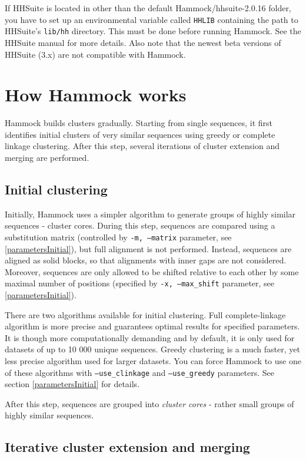 \documentclass[11pt, a4paper, twoside, titlepage]{article}
\begin{document}
If HHSuite is located in other than the default Hammock/hhsuite-2.0.16 folder, you have to set up an environmental variable called \texttt{HHLIB} containing the path to HHSuite's \texttt{lib/hh} directory. This must be done before running Hammock. See the HHSuite manual for more details. Also note that the newest beta versions of HHSuite (3.x) are not compatible with Hammock. 


\section{How Hammock works}
\label{howhammockworks}
Hammock builds clusters gradually. Starting from single sequences, it first identifies initial clusters of very similar sequences using greedy or complete linkage clustering. After this step, several iterations of cluster extension and merging are performed.

\subsection{Initial clustering}
Initially, Hammock uses a simpler algorithm to generate groups of highly similar sequences - cluster cores. During this step, sequences are compared using a substitution matrix (controlled by \texttt{-m, --matrix} parameter, see \ref{parametersInitial}), but full alignment is not performed. Instead, sequences are aligned as solid blocks, so that alignments with inner gaps are not considered. Moreover, sequences are only allowed to be shifted relative to each other by some maximal number of positions (specified by \texttt{-x, --max\_shift} parameter, see \ref{parametersInitial}). 

There are two algorithms available for initial clustering. Full complete-linkage algorithm is more precise and guarantees optimal results for specified parameters. It is though more computationally demanding and by default, it is only used for datasets of up to 10 000 unique sequences. Greedy clustering is a much faster, yet less precise algorithm used for larger datasets. You can force Hammock to use one of these algorithms with \texttt{--use\_clinkage} and \texttt{--use\_greedy} parameters. See section \ref{parametersInitial} for details.

After this step, sequences are grouped into \emph{cluster cores} - rather small groups of highly similar sequences.

\subsection{Iterative cluster extension and merging}
\end{document}
